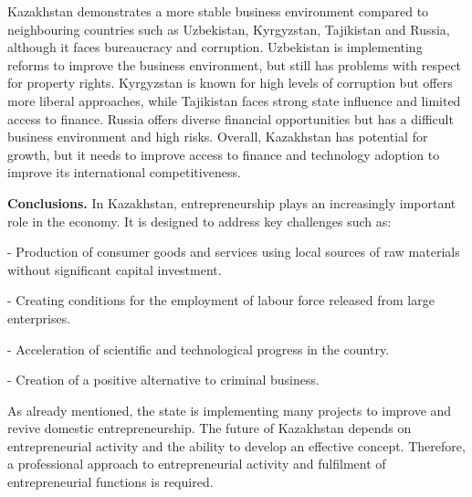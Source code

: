 % 
% 
% 
% 

Kazakhstan demonstrates a more stable business environment compared to
neighbouring countries such as Uzbekistan, Kyrgyzstan, Tajikistan and
Russia, although it faces bureaucracy and corruption. Uzbekistan is
implementing reforms to improve the business environment, but still has
problems with respect for property rights. Kyrgyzstan is known for high
levels of corruption but offers more liberal approaches, while
Tajikistan faces strong state influence and limited access to finance.
Russia offers diverse financial opportunities but has a difficult
business environment and high risks. Overall, Kazakhstan has potential
for growth, but it needs to improve access to finance and technology
adoption to improve its international competitiveness.

{\bfseries Conclusions.} In Kazakhstan, entrepreneurship plays an
increasingly important role in the economy. It is designed to address
key challenges such as:

- Production of consumer goods and services using local sources of raw
materials without significant capital investment.

- Creating conditions for the employment of labour force released from
large enterprises.

- Acceleration of scientific and technological progress in the country.

- Creation of a positive alternative to criminal business.

As already mentioned, the state is implementing many projects to improve
and revive domestic entrepreneurship. The future of Kazakhstan depends
on entrepreneurial activity and the ability to develop an effective
concept. Therefore, a professional approach to entrepreneurial activity
and fulfilment of entrepreneurial functions is required.

